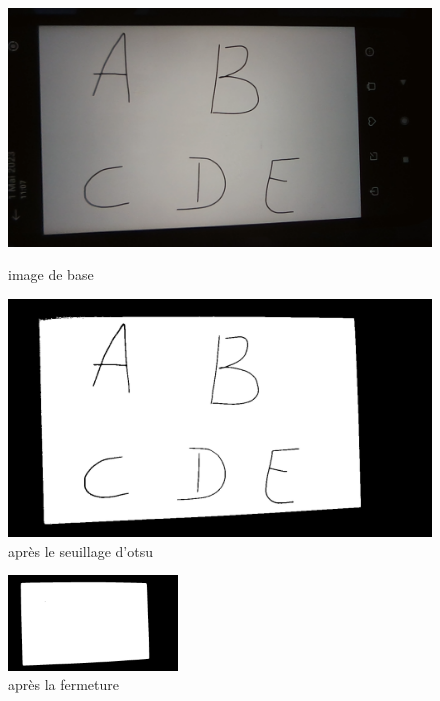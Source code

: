 \documentclass[a4paper]{article}
\begin{document}
				
				\hspace*{1.5cm}
				\begin{figure}[h!]
					\centering
					\begin{minipage}{.5\textwidth}
					  \centering
					  \includegraphics[width=.8\linewidth]{sansOtsu.png}
					  \caption{image de base}
					  \label{fig:sansOtsu}
					\end{minipage}%
					\begin{minipage}{.5\textwidth}
					  \centering
					  \includegraphics[width=.8\linewidth]{apresOtsu.png}
					  \caption{après le seuillage d'otsu}
					  \label{fig:apresOtsu}
					\end{minipage}
				\end{figure}


				\begin{figure}[h!]
					\centering
					\includegraphics[width=0.4\textwidth]{apresFermeture.png}
					\caption{après la fermeture}
					\label{fig:apresFermeture}
				\end{figure}
\end{document}
